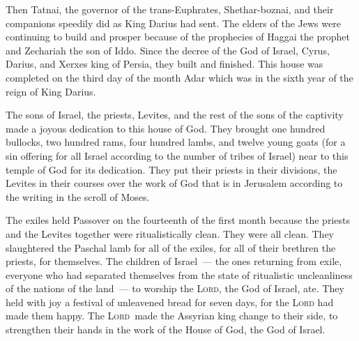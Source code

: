 \begin{inparaenum}\setcounter{enumi}{12}
   Then Tatnai, the governor of the trans-Euphrates, Shethar-boznai, and their companions speedily did as King Darius had sent.%
   The elders of the Jews were continuing to build and prosper because of the prophecies of Haggai the prophet and Zechariah the son of Iddo. Since the decree of the God of Israel, Cyrus, Darius, and Xerxes king of Persia, they built and finished.%
   This house was completed on the third day of the month Adar which was in the sixth year of the reign of King Darius.%
  
   The sons of Israel, the priests, Levites, and the rest of the sons of the captivity made a joyous dedication to this house of God.%
   They brought one hundred bullocks, two hundred rams, four hundred lambs, and twelve young goats (for a sin offering for all Israel according to the number of tribes of Israel) near to this temple of God for its dedication.%
   They put their priests in their divisions, the Levites in their courses over the work of God that is in Jerusalem according to the writing in the scroll of Moses.%
  
   The exiles held Passover on the fourteenth of the first month%
   because the priests and the Levites together were ritualistically clean. They were all clean. They slaughtered the Paschal lamb for all of the exiles, for all of their brethren the priests, for themselves.%
   The children of Israel~--- the ones returning from exile, everyone who had separated themselves from the state of ritualistic uncleanliness of the nations of the land~--- to worship the \textsc{Lord}, the God of Israel, ate.%
   They held with joy a festival of unleavened bread for seven days, for the \textsc{Lord} had made them happy. The \textsc{Lord}\understood\ made the Assyrian king change to their side, to strengthen their hands in the work of the House of God, the God of Israel.%
\end{inparaenum}
